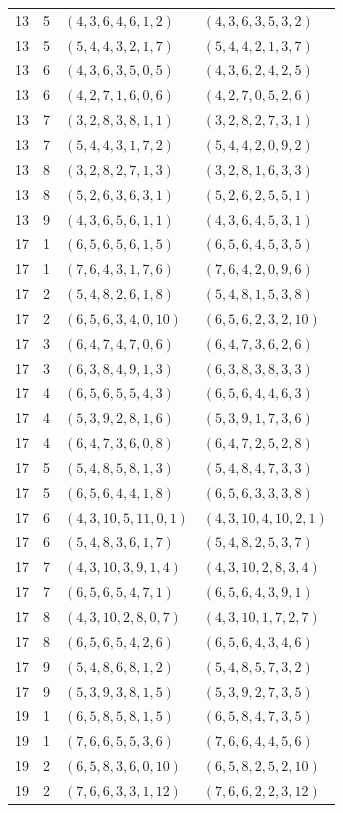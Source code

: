 \documentclass[11pt,a4paper]{article}
\theoremstyle{definition}
\numberwithin{equation}{section}
\begin{document}
\begin{longtable}{rrll}
13&5&$(4,3,6,4,6,1,2)$&$(4,3,6,3,5,3,2)$\\
13&5&$(5,4,4,3,2,1,7)$&$(5,4,4,2,1,3,7)$\\
13&6&$(4,3,6,3,5,0,5)$&$(4,3,6,2,4,2,5)$\\
13&6&$(4,2,7,1,6,0,6)$&$(4,2,7,0,5,2,6)$\\
13&7&$(3,2,8,3,8,1,1)$&$(3,2,8,2,7,3,1)$\\
13&7&$(5,4,4,3,1,7,2)$&$(5,4,4,2,0,9,2)$\\
13&8&$(3,2,8,2,7,1,3)$&$(3,2,8,1,6,3,3)$\\
13&8&$(5,2,6,3,6,3,1)$&$(5,2,6,2,5,5,1)$\\
13&9&$(4,3,6,5,6,1,1)$&$(4,3,6,4,5,3,1)$\\
17&1&$(6,5,6,5,6,1,5)$&$(6,5,6,4,5,3,5)$\\
17&1&$(7,6,4,3,1,7,6)$&$(7,6,4,2,0,9,6)$\\
17&2&$(5,4,8,2,6,1,8)$&$(5,4,8,1,5,3,8)$\\
17&2&$(6,5,6,3,4,0,10)$&$(6,5,6,2,3,2,10)$\\
17&3&$(6,4,7,4,7,0,6)$&$(6,4,7,3,6,2,6)$\\
17&3&$(6,3,8,4,9,1,3)$&$(6,3,8,3,8,3,3)$\\
17&4&$(6,5,6,5,5,4,3)$&$(6,5,6,4,4,6,3)$\\
17&4&$(5,3,9,2,8,1,6)$&$(5,3,9,1,7,3,6)$\\
17&4&$(6,4,7,3,6,0,8)$&$(6,4,7,2,5,2,8)$\\
17&5&$(5,4,8,5,8,1,3)$&$(5,4,8,4,7,3,3)$\\
17&5&$(6,5,6,4,4,1,8)$&$(6,5,6,3,3,3,8)$\\
17&6&$(4,3,10,5,11,0,1)$&$(4,3,10,4,10,2,1)$\\
17&6&$(5,4,8,3,6,1,7)$&$(5,4,8,2,5,3,7)$\\
17&7&$(4,3,10,3,9,1,4)$&$(4,3,10,2,8,3,4)$\\
17&7&$(6,5,6,5,4,7,1)$&$(6,5,6,4,3,9,1)$\\
17&8&$(4,3,10,2,8,0,7)$&$(4,3,10,1,7,2,7)$\\
17&8&$(6,5,6,5,4,2,6)$&$(6,5,6,4,3,4,6)$\\
17&9&$(5,4,8,6,8,1,2)$&$(5,4,8,5,7,3,2)$\\
17&9&$(5,3,9,3,8,1,5)$&$(5,3,9,2,7,3,5)$\\
19&1&$(6,5,8,5,8,1,5)$&$(6,5,8,4,7,3,5)$\\
19&1&$(7,6,6,5,5,3,6)$&$(7,6,6,4,4,5,6)$\\
19&2&$(6,5,8,3,6,0,10)$&$(6,5,8,2,5,2,10)$\\
19&2&$(7,6,6,3,3,1,12)$&$(7,6,6,2,2,3,12)$\\

\end{longtable}
\end{document}
